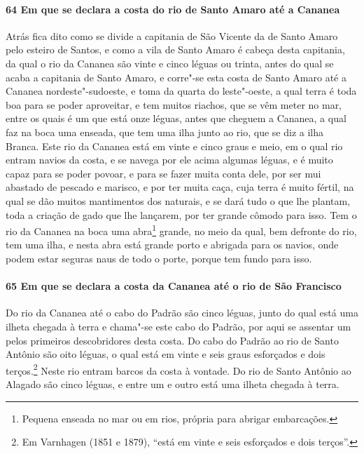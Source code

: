 \begin{linenumbers}
\paragraph{64 Em que se declara a costa do rio de Santo Amaro até a Cananea} \quad
Atrás fica dito como se divide a capitania de São Vicente da de Santo Amaro pelo esteiro
de Santos, e como a vila de Santo Amaro é cabeça desta capitania, da qual o rio da Cananea
são vinte e cinco léguas ou trinta, antes do qual se acaba a capitania de Santo Amaro, e
corre"-se esta costa de Santo Amaro até a Cananea nordeste"-sudoeste, e toma da quarta do
leste"-oeste, a qual terra é toda boa para se poder aproveitar, e tem muitos riachos, que
se vêm meter no mar, entre os quais é um que está onze léguas, antes que cheguem a
Cananea, a qual faz na boca uma enseada, que tem uma ilha junto ao rio, que se diz a ilha
Branca. Este rio da Cananea está em vinte e cinco graus e meio, em o qual rio entram
navios da costa, e se navega por ele acima algumas léguas, e é muito capaz para se poder
povoar, e para se fazer muita conta dele, por ser mui abastado de pescado e marisco, e por
ter muita caça, cuja terra é muito fértil, na qual se dão muitos mantimentos dos naturais,
e se dará tudo o que lhe plantam, toda a criação de gado que lhe lançarem, por ter grande
cômodo para isso. Tem o rio da Cananea na boca uma abra\footnote{ Pequena enseada no mar
ou em rios, própria para abrigar embarcações.} grande, no meio da qual, bem defronte do
rio, tem uma ilha, e nesta abra está grande porto e abrigada para os navios, onde podem
estar seguras naus de todo o porte, porque tem fundo para isso.

\paragraph{65 Em que se declara a costa da Cananea até o rio de São Francisco} \quad
Do rio da Cananea até o cabo do Padrão são cinco léguas, junto do qual está uma ilheta
chegada à terra e chama"-se este cabo do Padrão, por aqui se assentar um pelos primeiros
descobridores desta costa. Do cabo do Padrão ao rio de Santo Antônio são oito léguas, o
qual está em vinte e seis graus esforçados e dois terços.\footnote{ Em Varnhagen (1851 e
1879), ``está em vinte e seis esforçados e dois terços''.} Neste rio entram barcos da
costa à vontade. Do rio de Santo Antônio ao Alagado são cinco léguas, e entre um e outro
está uma ilheta chegada à terra.


\end{linenumbers}
